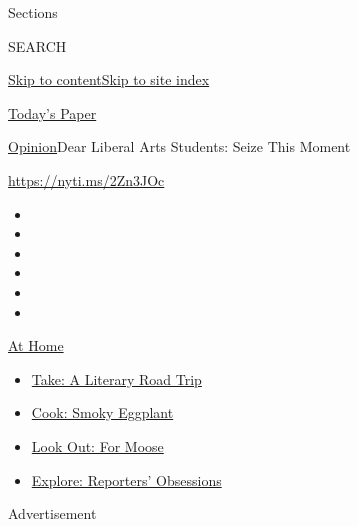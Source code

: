Sections

SEARCH

\protect\hyperlink{site-content}{Skip to
content}\protect\hyperlink{site-index}{Skip to site index}

\href{https://myaccount.nytimes3xbfgragh.onion/auth/login?response_type=cookie\&client_id=vi}{}

\href{https://www.nytimes3xbfgragh.onion/section/todayspaper}{Today's
Paper}

\href{/section/opinion}{Opinion}\textbar{}Dear Liberal Arts Students:
Seize This Moment

\url{https://nyti.ms/2Zn3JOc}

\begin{itemize}
\item
\item
\item
\item
\item
\item
\end{itemize}

\href{https://www.nytimes3xbfgragh.onion/spotlight/at-home?action=click\&pgtype=Article\&state=default\&region=TOP_BANNER\&context=at_home_menu}{At
Home}

\begin{itemize}
\tightlist
\item
  \href{https://www.nytimes3xbfgragh.onion/2020/07/28/books/time-for-a-literary-road-trip.html?action=click\&pgtype=Article\&state=default\&region=TOP_BANNER\&context=at_home_menu}{Take:
  A Literary Road Trip}
\item
  \href{https://www.nytimes3xbfgragh.onion/2020/07/29/magazine/bored-with-your-home-cooking-some-smoky-eggplant-will-fix-that.html?action=click\&pgtype=Article\&state=default\&region=TOP_BANNER\&context=at_home_menu}{Cook:
  Smoky Eggplant}
\item
  \href{https://www.nytimes3xbfgragh.onion/2020/07/27/travel/moose-michigan-isle-royale.html?action=click\&pgtype=Article\&state=default\&region=TOP_BANNER\&context=at_home_menu}{Look
  Out: For Moose}
\item
  \href{https://www.nytimes3xbfgragh.onion/interactive/2020/at-home/even-more-reporters-editors-diaries-lists-recommendations.html?action=click\&pgtype=Article\&state=default\&region=TOP_BANNER\&context=at_home_menu}{Explore:
  Reporters' Obsessions}
\end{itemize}

Advertisement

